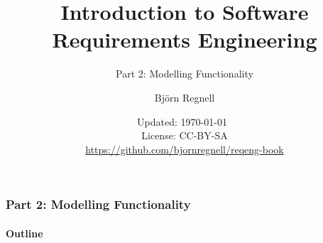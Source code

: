 \documentclass{reqenglecture}
\title{Introduction to Software Requirements Engineering}
\subtitle{Part 2: Modelling Functionality}
\author{Björn Regnell}
\date{\vspace{1em}\footnotesize Updated: \today~
\\ License: CC-BY-SA 
\\ \url{https://github.com/bjornregnell/reqeng-book} 
}
\begin{document}
\maketitle

\begin{frame}
\frametitle{Part 2: Modelling Functionality}
\framesubtitle{Outline}
\tableofcontents
\end{frame}



\end{document}
